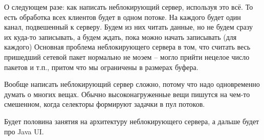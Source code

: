 О следующем разе: как написать неблокирующий сервер, используя это всё.
То есть обработка всех клиентов будет в одном потоке.
На каждого будет один канал, подвешенный к серверу.
Будем из них читать данные, но не будем сразу их куда-то записывать, а будем ждать, пока можно начать записывать (для каждого)
Основная проблема неблокирующего сервера в том, что считать 
весь пришедший сетевой пакет нормально не моэем -- 
могло прийти нецелое число пакетов и т.п., притом что мы ограничены в размерах буфера.

Вообще написать неблокирующий сервер сложно, потому что надо одновременно думать о многих вещах.
Обычно высоконагруженные вещи пишутся на чем-то смешенном, когда селекторы формируют задачки в пул потоков.

Будет половина занятия на архитектуру неблокирующего сервера, а дальше будет про Java UI.
